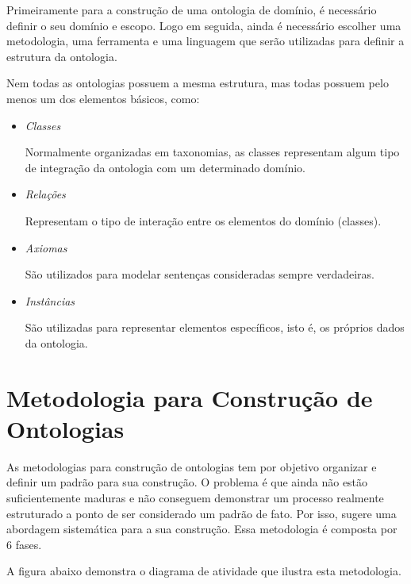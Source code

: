 Primeiramente para a construção de uma ontologia de domínio, é necessário definir
o seu domínio e escopo. Logo em seguida, ainda é necessário escolher uma 
metodologia, uma ferramenta e uma linguagem que serão utilizadas para definir a 
estrutura da ontologia. 

Nem todas as ontologias possuem a mesma estrutura, mas todas possuem pelo menos 
um dos elementos básicos, como:

\begin{itemize}
    \item \textit{Classes}
    
    Normalmente organizadas em taxonomias, as classes representam algum tipo de
    integração da ontologia com um determinado domínio.
    
    \item \textit{Relações}
    
    Representam o tipo de interação entre os elementos do domínio (classes).
    
    \item \textit{Axiomas}
    
    São utilizados para modelar sentenças consideradas sempre verdadeiras.
    
    \item \textit{Instâncias}
    
    São utilizadas para representar elementos específicos, isto é, os próprios 
    dados da ontologia.
\end{itemize}

\section{Metodologia para Construção de Ontologias}
\label{sec:metodologias_para_construcao_de_ontologias}

As metodologias para construção de ontologias tem por objetivo organizar e definir
um padrão para sua construção. O problema é que ainda não estão suficientemente
maduras e não conseguem demonstrar um processo realmente estruturado a ponto de 
ser considerado um padrão de fato. Por isso, \cite{guizzardidesenvolvimento} 
sugere uma abordagem sistemática para a sua construção. Essa metodologia é 
composta por 6 fases.

A figura abaixo demonstra o diagrama de atividade que ilustra esta metodologia.

